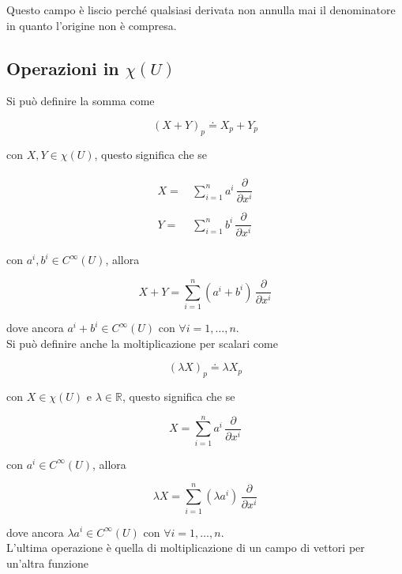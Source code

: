 Questo campo è liscio perché qualsiasi derivata non annulla mai il denominatore in quanto l'origine non è compresa.

\subsection{Operazioni in $ \chi(U) $}

Si può definire la somma come

\begin{equation}
	(X+Y)_{p} \doteq X_{p} + Y_{p}
\end{equation}

con $ X,Y \in \chi(U) $, questo significa che se

\begin{align}
	\begin{split}
		X =& \, \sum_{i=1}^{n} a^{i} \, \dfrac{\partial}{\partial x^{i}}\\\\
		Y =& \, \sum_{i=1}^{n} b^{i} \, \dfrac{\partial}{\partial x^{i}}
	\end{split}
\end{align}

con $ a^{i},b^{i} \in C^{\infty}(U) $, allora

\begin{equation}
	X+Y = \sum_{i=1}^{n} (a^{i}+b^{i}) \, \dfrac{\partial}{\partial x^{i}}
\end{equation}

dove ancora $ a^{i}+b^{i} \in C^{\infty}(U) $ con $ \forall i=1,\dots,n $.\\
Si può definire anche la moltiplicazione per scalari come

\begin{equation}
	(\lambda X)_{p} \doteq \lambda X_{p}
\end{equation}

con $ X \in \chi(U) $ e $ \lambda \in \mathbb{R} $, questo significa che se

\begin{equation}
	X = \sum_{i=1}^{n} a^{i} \, \dfrac{\partial}{\partial x^{i}}
\end{equation}

con $ a^{i} \in C^{\infty}(U) $, allora

\begin{equation}
	\lambda X = \sum_{i=1}^{n} (\lambda a^{i}) \, \dfrac{\partial}{\partial x^{i}}
\end{equation}

dove ancora $ \lambda a^{i} \in C^{\infty}(U) $ con $ \forall i=1,\dots,n $.\\
L'ultima operazione è quella di moltiplicazione di un campo di vettori per un'altra funzione

